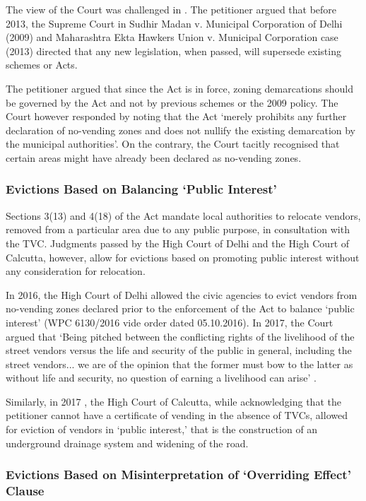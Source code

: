 \documentclass[a4paper, 12pt, twoside, table]{article}
\begin{document}
{The view of the Court was challenged in \cite{VKMMP}. The petitioner argued that before 2013, the Supreme Court in Sudhir Madan v. Municipal Corporation of Delhi (2009) and Maharashtra Ekta Hawkers Union v. Municipal Corporation case (2013) directed that any new legislation, when passed, will supersede existing schemes or Acts. 

The petitioner argued that since the Act is in force, zoning demarcations should be governed by the Act and not by previous schemes or the 2009 policy. The Court however responded by noting that the Act `merely prohibits any further declaration of no-vending zones and does not nullify the existing demarcation by the municipal authorities'. On the contrary, the Court tacitly recognised that certain areas might have already been declared as no-vending zones. 

\subsubsection*{Evictions Based on Balancing `Public Interest'}

Sections 3(13) and 4(18) of the Act mandate local authorities to relocate vendors, removed from a particular area due to any public purpose, in consultation with the TVC. Judgments passed by the High Court of Delhi and the High Court of Calcutta, however, allow for evictions based on promoting public interest without any consideration for relocation.

In 2016, the High Court of Delhi allowed the civic agencies to evict vendors from no-vending zones declared prior to the enforcement of the Act to balance `public interest' (WPC 6130/2016 vide order dated 05.10.2016). In 2017, the Court argued that `Being pitched between the conflicting rights of the livelihood of the street vendors versus the life and security of the public in general, including the street vendors... we are of the opinion that the former must bow to the latter as without life and security, no question of earning a livelihood can arise' \parencite{VKMMP}.

Similarly, in 2017 \parencite{GopalS}, the High Court of Calcutta, while acknowledging that the petitioner cannot have a certificate of vending in the absence of TVCs, allowed for eviction of vendors in `public interest,' that is the construction of an underground drainage system and widening of the road. 

\subsubsection*{Evictions Based on Misinterpretation of `Overriding Effect' Clause}

}
\end{document}
